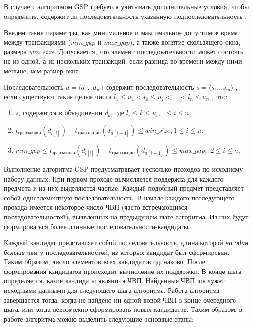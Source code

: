 В случае с алгоритмом GSP требуется учитывать дополнительные условия, чтобы определить, содержит ли последовательность указанную подпоследовательность \cite{gsp}.

Введем такие параметры, как минимальное и максимальное допустимое время между транзакциями ($min\_gap$ и $max\_gap$), а также понятие скользящего окна, размера $win\_size$. Допускается, что элемент последовательности может состоять не из одной, а из нескольких транзакций, если разница во времени между ними меньше, чем размер окна.

Последовательность $d = \langle d_1...d_m \rangle$ содержит последовательность
$s = \langle s_1...s_m \rangle$ , если существуют такие целые числа $l_1 ≤ u_1 < l_2 ≤ u_2 < ... < l_n ≤ u_n$ , что:

\begin{enumerate}
\item $s_i$ содержится в объединении $d_k$, где $l_i ≤ k ≤ u_i, 1 ≤ i ≤ n$.
\item $t_{\text{транзакции}}(d_{l[i]}) - t_{\text{транзакции}} (d_{u[i-1]}) ≤ win\_size, 1 ≤ i ≤ n.$
\item $min\_gap ≤ t_{\text{транзакции}}(d_{l[i]}) - t_{\text{транзакции}}(d_{u[i-1]}) ≤ max\_gap,$ \newline $2≤i≤n.$
\end{enumerate}

Выполнение алгоритма GSP предусматривает несколько проходов по исходному набору данных. При первом проходе вычисляется поддержка для каждого предмета и из них выделяются частые. Каждый подобный предмет представляет собой одноэлементную последовательность. В начале каждого последующего прохода имеется некоторое число ЧВП (часто встречающихся последовательностей), выявленных на предыдущем шаге алгоритма. Из них будут формироваться более длинные последовательности-кандидаты.

Каждый кандидат представляет собой последовательность, длина которой \textit{на один больше} чем у последовательностей, из которых кандидат был сформирован. Таким образом, число элементов всех кандидатов одинаково. После формирования кандидатов происходит вычисление их поддержки. В конце шага определяется, какие кандидаты являются ЧВП. Найденные ЧВП послужат исходными данными для следующего шага алгоритма. Работа алгоритма завершается тогда, когда не найдено ни одной новой ЧВП в конце очередного шага, или когда невозможно сформировать новых кандидатов. Таким образом, в работе алгоритма можно выделить следующие основные этапы:

